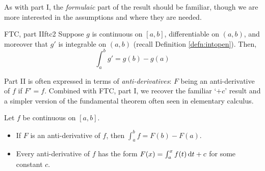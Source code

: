 \vfil\goodbreak



As with part I, the \emph{formulaic} part of the result should be familiar, though we are more interested in the assumptions and where they are needed.

\begin{thm}{FTC, part II}{ftc2}
	Suppose $g$ is continuous on $[a,b]$, differentiable on $(a,b)$, and moreover that $g'$ is integrable on $(a,b)$ (recall Definition \ref{defn:intopen}). Then,
	\[
		\int_a^bg'=g(b)-g(a)
	\]
\end{thm}


Part II is often expressed in terms of \emph{anti-derivatives}: $F$ being an anti-derivative of $f$ if $F'=f$. Combined with FTC, part I, we recover the familiar `$+c$' result and a simpler version of the fundamental theorem often seen in elementary calculus.


\begin{cor}{}{}
	Let $f$ be continuous on $[a,b]$.
	\begin{itemize}
	  \item If $F$ is an anti-derivative of $f$, then $\int_a^bf=F(b)-F(a)$.
	  \item Every anti-derivative of $f$ has the form $F(x)=\int_a^xf(t)\,{\mathrm{d} t}+c$ for some constant $c$.
	\end{itemize}
\end{cor}


